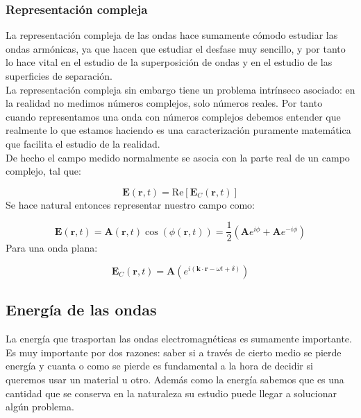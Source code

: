 \documentclass[12pt]{article}
\newcommand{\parentesis}[1]{\left( #1  \right)}
\newcommand{\Real}{\mathrm{Re}}
\newcommand{\En}{\mathbf{E}}
\newcommand{\kn}{\mathbf{k}}
\newcommand{\rn}{\mathbf{r}}
\newcommand{\An}{\mathbf{A}}
\numberwithin{equation}{section}
\numberwithin{figure}{section}
\begin{document}
\subsubsection{Representación compleja}

La representación compleja de las ondas hace sumamente cómodo estudiar las ondas armónicas, ya que hacen que estudiar el desfase muy sencillo, y por tanto lo hace vital en el estudio de la superposición de ondas y en el estudio de las superficies de separación. \\

La representación compleja sin embargo tiene un problema intrínseco asociado: en la realidad no medimos números complejos, solo números reales. Por tanto cuando representamos una onda con números complejos debemos entender que realmente lo que estamos haciendo es una caracterización puramente matemática que facilita el estudio de la realidad. \\

De hecho el campo medido normalmente se asocia con la parte real de un campo complejo, tal que:

\begin{equation}
\En (\rn,t) = \Real [\En_C (\rn,t) ]
\end{equation}
Se hace natural entonces representar nuestro campo como:

\begin{equation}
\En (\rn,t) = \An (\rn,t) \cos (\phi(\rn,t)) = \dfrac{1}{2} \parentesis{\An e^{i \phi} + \An e^{- i \phi}}
\end{equation}
Para una onda plana:

\begin{equation}
\En_C (\rn,t) =  \An \parentesis{e^{i ( \kn \cdot \rn - \omega t + \delta)}}
\end{equation}

\subsection{Energía de las ondas}

La energía que trasportan las ondas electromagnéticas es sumamente importante. Es muy importante por dos razones: saber si a través de cierto medio se pierde energía y cuanta o como se pierde es fundamental a la hora de decidir si queremos usar un material u otro. Además como la energía sabemos que es una cantidad que se conserva en la naturaleza su estudio puede llegar a solucionar algún problema. \\
\end{document}
